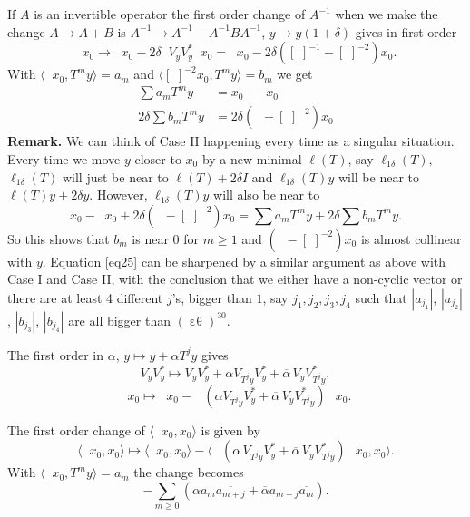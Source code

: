 \documentclass[12pt,oneside,reqno]{amsart}
\theoremstyle{definition}
\DeclareMathOperator*{\VV}{[\,\, ]^{-1}}
\DeclareMathOperator*{\VE}{\varepsilon\theta}
\begin{document}
If $A$ is an invertible operator the first order change of $A^{-1}$ when we make the change  $A \rightarrow A+B$ is $A^{-1} \rightarrow A^{-1} - A^{-1} B A^{-1}$, $y \rightarrow y (1+\delta)$  gives in first order
$$\VV x_0 \rightarrow \VV x_0 - 2 \delta \VV V_y V_y^* \VV x_0 = \VV x_0 - 2 \delta ([\,\,]^{-1} - [\,\,]^{-2}) x_0.$$
With $\langle \VV x_0, T^m y \rangle = a_m$ and $\langle [\,\,]^{-2}x_0, T^m y \rangle = b_m$ we get  
\begin{align*}
\sum a_m T^m y & = x_0 - \VV x_0\\
2 \delta \sum b_m T^m y &= 2 \delta (\VV - [\,\,]^{-2}) x_0
\end{align*}
\textbf{Remark.} We can think of Case II happening  every time as a singular situation. Every time we move $y$ closer to $x_0$ by a new minimal $\ell (T)$, say $\ell_{1 \delta}(T),$ $\ell_{1 \delta}(T)$ will just be near to $\ell(T)  + 2 \delta I$ and $\ell_{1 \delta}(T) y$ will be near to $\ell(T) y + 2 \delta y$.  However, $\ell_{1 \delta}(T)y$ will also be near to 
$$x_0 - \VV x_0 + 2 \delta (\VV - [\, \,]^{-2})x_0 = \sum a_m T^m y + 2 \delta \sum b_m T^m y.$$
So this shows that $b_m$ is near $0$ for $m \ge 1$ and $(\VV - [\, \,]^{-2})x_0$ is almost collinear with $y$. Equation \eqref{eq25} can be sharpened by a similar argument as above with Case I and Case II, with the conclusion that we either have a non-cyclic vector or there are at least 4 different $j$'s, bigger than $1$, say $j_1, j_2, j_3, j_4$ such that $|a_{j_1}|$, $|a_{j_2}|$, $|b_{j_3}|$, $|b_{j_4}|$ are all bigger than $(\VE)^{30}$.
%
\bigskip \bigskip

The first order in $\alpha$, $ y \mapsto y + \alpha T^j y$ gives 
$$V_y V_y^* \mapsto V_y V_y^* + \alpha V_{T^jy} V_y^* + \overline{\alpha} \, V_y V^*_{T^jy},$$
$$\VV x_0 \mapsto \VV x_0 - \VV \, \left( \alpha V_{T^jy} V_y^* + \overline{\alpha} \, V_y V^*_{T^jy}\right)\, \VV x_0.$$

The first order change of $\langle \VV x_0, x_0\rangle$ is given by
$$\langle \VV x_0, x_0\rangle \mapsto \langle \VV x_0, x_0\rangle - \langle \VV \, \left( \alpha \, V_{T^jy} V_y^* + \overline{\alpha} \, V_y V^*_{T^j y}\right) \VV \,x_0, x_0 \rangle .$$
With $\displaystyle \langle \VV x_0, T^m y\rangle = a_m$ the change becomes
\begin{equation}\label{eq28}
- \sum_{m \ge 0} \left( \alpha a_m \overline{a_{m+j}} + \overline{\alpha} a_{m+j} \overline{a_m}\right).	
\end{equation}
\end{document}
